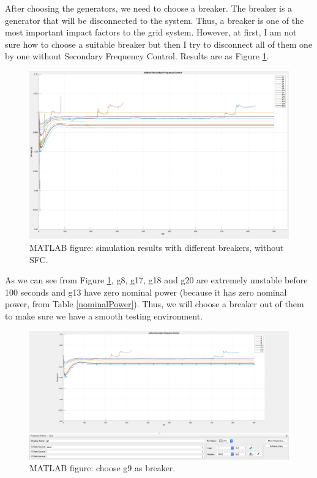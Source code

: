 \documentclass{report}
\begin{document}
After choosing the generators, we need to choose a breaker. The breaker is a generator that will be disconnected to the system. Thus, a breaker is one of the most important impact factors to the grid system. However, at first, I am not sure how to choose a suitable breaker but then I try to disconnect all of them one by one without Secondary Frequency Control. Results are as Figure \textcolor{red}{\ref{4_1_1_without1}}.\\

\begin{figure}[htbp]
\centering
\includegraphics[width = .891\textwidth]{figure/4_1_1_without1.jpeg}
\caption{MATLAB figure: simulation results with different breakers, without SFC.}
\label{4_1_1_without1}
\end{figure}

As we can see from Figure \textcolor{red}{\ref{4_1_1_without1}}, g8, g17, g18 and g20 are extremely unstable before 100 seconds and g13 have zero nominal power (because it has zero nominal power, from Table \textcolor{red}{\ref{nominalPower}}). Thus, we will choose a breaker out of them to make sure we have a smooth testing environment.\\


\begin{figure}[htbp]
\centering
\includegraphics[width = .891\textwidth]{figure/4_1_1_without2.jpeg}
\caption{MATLAB figure: choose g9 as breaker.}
\label{4_1_1_without2}
\end{figure}
\end{document}
